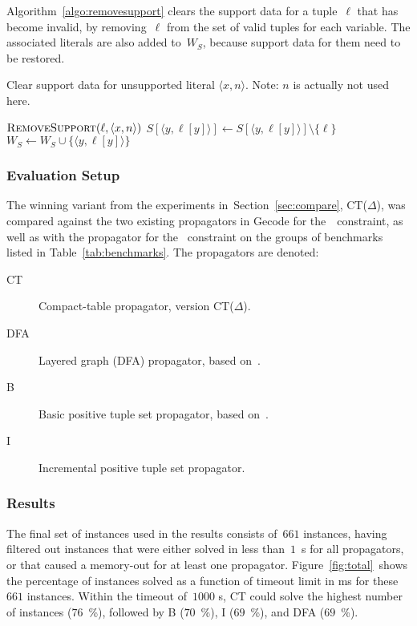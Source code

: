 \documentclass[a4paper,11pt]{article}
\newcommand{\Secref}[1]{Section~\ref{#1}}
\newcommand{\Algoref}[1]{Algorithm~\ref{#1}}
\newcommand{\Table}{\Constraint{Table}}
\newcommand{\Regular}{\Constraint{Regular}}
\newcommand{\FOREACH}[1]{\FORALL{{#1} \textbf{do}}}
\newcommand{\ENDFOREACH}{\ENDFOR}
\def\PROCEDURE{\item[\textbf{PROCEDURE}]}
\def\RemoveSupport{\textsc{RemoveSupport}}
\numberwithin{equation}{section}
\begin{document}
\begin{description}
\Algoref{algo:removesupport} clears the support data for a tuple~$\ell$ that has
become invalid, by removing~$\ell$ from the set of valid tuples for each variable.
The associated literals are also added to~$W_S$, because support data for them
need to be restored.
 
\begin{algorithm}
\caption{Clear support data for unsupported literal $\langle x,n
  \rangle$.  Note: $n$ is actually not used here.}
  \label{algo:removesupport}
\begin{algorithmic}[1]
  \PROCEDURE $\RemoveSupport(\ell, \langle x,n \rangle)$
  \FOREACH{$y \in X$}
    \STATE $S[\langle y,\ell[y] \rangle] \gets S[\langle y,\ell[y] \rangle] \setminus \{ \ell \}$
      \STATE $W_S \gets W_S \cup \{ \langle y,\ell[y] \rangle \}$
    \ENDIF
  \ENDFOREACH
\end{algorithmic}
\end{algorithm}

   \end{description}
\clearpage
\subsubsection{Evaluation Setup}
The winning variant from the experiments in~\Secref{sec:compare},
CT($\Delta$), was compared against the two existing propagators
in Gecode for the~\Table~constraint, as well as with the propagator
for the \Regular~constraint on the groups of benchmarks
listed in Table~\ref{tab:benchmarks}. The propagators are
denoted:

\begin{description}
  \item[CT] Compact-table propagator, version CT($\Delta$).
  \item[DFA] Layered graph (DFA) propagator, based on~\cite{Pesant:seqs}.
  \item[B] Basic positive tuple set propagator, based on~\cite{DBLP:journals/ai/BessiereRYZ05}.
  \item[I] Incremental positive tuple set propagator.
\end{description}

\subsubsection{Results}

The final set of instances used in the results consists of~$661$ instances,
having filtered out instances that were either solved in less than~$1$~s for all
propagators, or that caused a memory-out for at least one propagator.
Figure~\ref{fig:total}~shows the percentage of instances solved as a function
of timeout limit in ms for these~$661$ instances. Within the timeout of~$1000$ s,
CT could solve the highest number of instances ($76$~\%), followed by B ($70$~\%),
I ($69$~\%), and DFA ($69$~\%).
\end{document}
